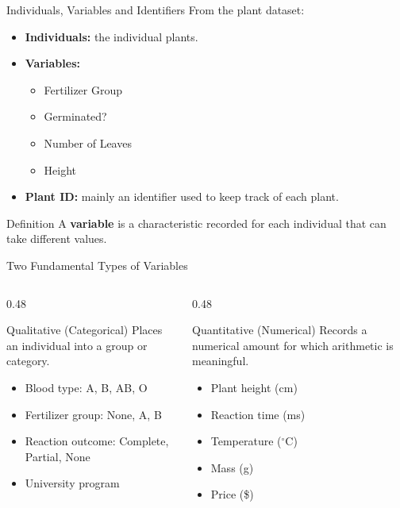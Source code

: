 \documentclass[aspectratio=169]{beamer}
\begin{document}
\begin{frame}{Individuals, Variables and Identifiers}
  From the plant dataset:
  \begin{itemize}
    \item \textbf{Individuals:} the individual plants.
    \item \textbf{Variables:}
    \begin{itemize}
      \item Fertilizer Group
      \item Germinated?
      \item Number of Leaves
      \item Height
    \end{itemize}
    \item \textbf{Plant ID:} mainly an identifier used to keep track of each plant.
  \end{itemize}
  \vspace{0.2cm}
  \begin{block}{Definition}
    A \textbf{variable} is a characteristic recorded for each individual that can take different values.
  \end{block}
\end{frame}

\begin{frame}{Two Fundamental Types of Variables}
  \begin{columns}[T]
    \begin{column}{0.48\textwidth}
      \begin{block}{Qualitative (Categorical)}
        Places an individual into a group or category.
        \begin{itemize}
          \item Blood type: A, B, AB, O
          \item Fertilizer group: None, A, B
          \item Reaction outcome: Complete, Partial, None
          \item University program
        \end{itemize}
      \end{block}
    \end{column}
    \begin{column}{0.48\textwidth}
      \begin{block}{Quantitative (Numerical)}
        Records a numerical amount for which arithmetic is meaningful.
        \begin{itemize}
          \item Plant height (cm)
          \item Reaction time (ms)
          \item Temperature ($^\circ$C)
          \item Mass (g)
          \item Price (\$)
        \end{itemize}
      \end{block}
    \end{column}
  \end{columns}
\end{frame}
\end{document}
